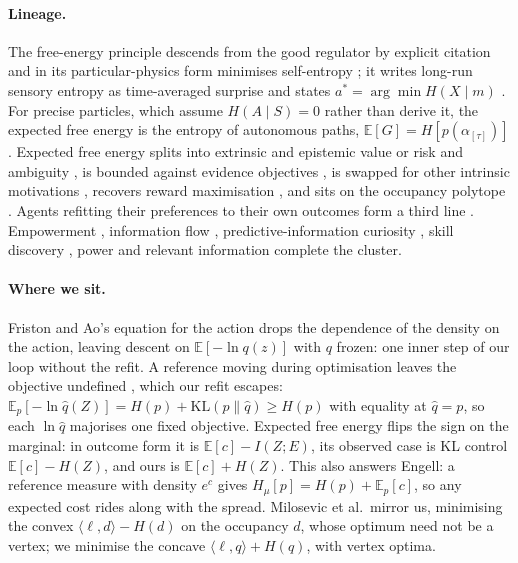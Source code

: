 \documentclass[10pt]{article}
\newcommand{\Hmu}{H_\mu}
\begin{document}
\paragraph{Lineage.}
The free-energy principle descends from the good regulator by explicit citation \citep{Friston-free12c} and in its particular-physics form minimises self-entropy \citep{Friston-free19}; it writes long-run sensory entropy as time-averaged surprise and states $a^*=\arg\min H(X\mid m)$ \citep{Friston-free12b}. For precise particles, which assume $H(A\mid S)=0$ rather than derive it, the expected free energy is the entropy of autonomous paths, $\mathbb{E}[G]=H[p(\alpha_{[\tau]})]$ \citep[Eq.~39]{Friston-free23}. Expected free energy splits into extrinsic and epistemic value \citep{Friston-active15} or risk and ambiguity \citep[Eq.~6]{Friston-active16}, is bounded against evidence objectives \citep{Millidge-understanding21}, is swapped for other intrinsic motivations \citep{Biehl-expanding18}, recovers reward maximisation \citep{DaCosta-reward23}, and sits on the occupancy polytope \citep{Milosevic-active26}. Agents refitting their preferences to their own outcomes form a third line \citep{Sajid-exploration21,Kim-emergence25}. Empowerment \citep{Klyubin-empowerment05}, information flow \citep{Ay-information08}, predictive-information curiosity \citep{Still-information12}, skill discovery \citep{Eysenbach-information21}, power \citep{Turner-optimal19} and relevant information \citep{Polani-information01} complete the cluster.

\paragraph{Where we sit.}
Friston and Ao's equation for the action drops the dependence of the density on the action, leaving descent on $\mathbb{E}[-\ln q(z)]$ with $q$ frozen: one inner step of our loop without the refit. A reference moving during optimisation leaves the objective undefined \citep{Gottwald-two20}, which our refit escapes: $\mathbb{E}_p[-\ln\hat q(Z)]=H(p)+\mathrm{KL}(p\|\hat q)\ge H(p)$ with equality at $\hat q=p$, so each $\ln\hat q$ majorises one fixed objective. Expected free energy flips the sign on the marginal: in outcome form it is $\mathbb{E}[c]-I(Z;E)$, its observed case is KL control $\mathbb{E}[c]-H(Z)$, and ours is $\mathbb{E}[c]+H(Z)$. This also answers Engell: a reference measure with density $e^{c}$ gives $\Hmu[p]=H(p)+\mathbb{E}_p[c]$, so any expected cost rides along with the spread. Milosevic et al.\ mirror us, minimising the convex $\langle \ell,d\rangle - H(d)$ on the occupancy $d$, whose optimum need not be a vertex; we minimise the concave $\langle \ell,q\rangle + H(q)$, with vertex optima.
\end{document}
